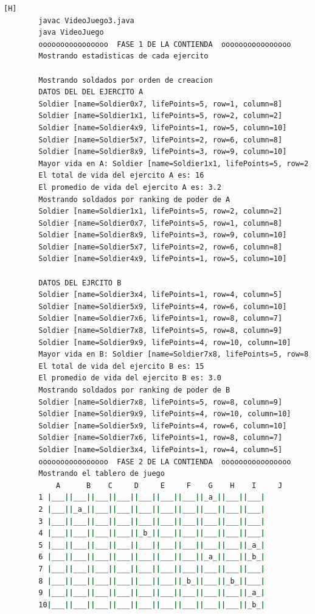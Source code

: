 \documentclass{article}
\begin{document}
	
	\begin{lstlisting}[language=bash,caption={Compilando y probando }][H]
		javac VideoJuego3.java
		java VideoJuego
		oooooooooooooooo  FASE 1 DE LA CONTIENDA  oooooooooooooooo
		Mostrando estadisticas de cada ejercito
		
		Mostrando soldados por orden de creacion
		DATOS DEL DEL EJERCITO A
		Soldier [name=Soldier0x7, lifePoints=5, row=1, column=8]
		Soldier [name=Soldier1x1, lifePoints=5, row=2, column=2]
		Soldier [name=Soldier4x9, lifePoints=1, row=5, column=10]
		Soldier [name=Soldier5x7, lifePoints=2, row=6, column=8]
		Soldier [name=Soldier8x9, lifePoints=3, row=9, column=10]
		Mayor vida en A: Soldier [name=Soldier1x1, lifePoints=5, row=2, column=2]
		El total de vida del ejercito A es: 16
		El promedio de vida del ejercito A es: 3.2
		Mostrando soldados por ranking de poder de A
		Soldier [name=Soldier1x1, lifePoints=5, row=2, column=2]
		Soldier [name=Soldier0x7, lifePoints=5, row=1, column=8]
		Soldier [name=Soldier8x9, lifePoints=3, row=9, column=10]
		Soldier [name=Soldier5x7, lifePoints=2, row=6, column=8]
		Soldier [name=Soldier4x9, lifePoints=1, row=5, column=10]
		
		DATOS DEL EJRCITO B
		Soldier [name=Soldier3x4, lifePoints=1, row=4, column=5]
		Soldier [name=Soldier5x9, lifePoints=4, row=6, column=10]
		Soldier [name=Soldier7x6, lifePoints=1, row=8, column=7]
		Soldier [name=Soldier7x8, lifePoints=5, row=8, column=9]
		Soldier [name=Soldier9x9, lifePoints=4, row=10, column=10]
		Mayor vida en B: Soldier [name=Soldier7x8, lifePoints=5, row=8, column=9]
		El total de vida del ejercito B es: 15
		El promedio de vida del ejercito B es: 3.0
		Mostrando soldados por ranking de poder de B
		Soldier [name=Soldier7x8, lifePoints=5, row=8, column=9]
		Soldier [name=Soldier9x9, lifePoints=4, row=10, column=10]
		Soldier [name=Soldier5x9, lifePoints=4, row=6, column=10]
		Soldier [name=Soldier7x6, lifePoints=1, row=8, column=7]
		Soldier [name=Soldier3x4, lifePoints=1, row=4, column=5]
		oooooooooooooooo  FASE 2 DE LA CONTIENDA  oooooooooooooooo
		Mostrando el tablero de juego
		    A      B    C     D     E     F    G    H    I     J
		1 |___||___||___||___||___||___||___||_a_||___||___|
		2 |___||_a_||___||___||___||___||___||___||___||___|
		3 |___||___||___||___||___||___||___||___||___||___|
		4 |___||___||___||___||_b_||___||___||___||___||___|
		5 |___||___||___||___||___||___||___||___||___||_a_|
		6 |___||___||___||___||___||___||___||_a_||___||_b_|
		7 |___||___||___||___||___||___||___||___||___||___|
		8 |___||___||___||___||___||___||_b_||___||_b_||___|
		9 |___||___||___||___||___||___||___||___||___||_a_|
		10|___||___||___||___||___||___||___||___||___||_b_|
	\end{lstlisting}
	
\end{document}
